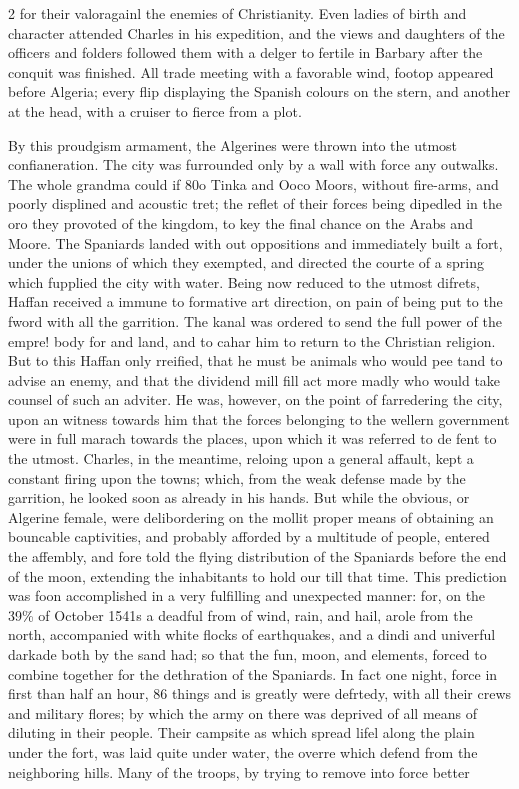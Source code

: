 \documentclass[10pt]{article}
\begin{document}
\begin{multicols}{2}\raggedcolumns
for their valoragainl the enemies of Christianity. Even ladies of birth and character attended Charles in his expedition, and the views and daughters of the officers and folders followed them with a delger to fertile in Barbary after the conquit was finished. All trade meeting with a favorable wind, footop appeared before Algeria; every flip displaying the Spanish colours on the stern, and another at the head, with a cruiser to fierce from a plot.

By this proudgism armament, the Algerines were thrown into the utmost confianeration. The city was furrounded only by a wall with force any outwalks. The whole grandma could if 80o Tinka and Ooco Moors, without fire-arms, and poorly displined and acoustic tret; the reflet of their forces being dipedled in the oro they provoted of the kingdom, to key the final chance on the Arabs and Moore. The Spaniards landed with out oppositions and immediately built a fort, under the unions of which they exempted, and directed the courte of a spring which fupplied the city with water. Being now reduced to the utmost difrets, Haffan received a immune to formative art direction, on pain of being put to the fword with all the garrition. The kanal was ordered to send the full power of the empre! body for and land, and to cahar him to return to the Christian religion. But to this Haffan only rreified, that he must be animals who would pee tand to advise an enemy, and that the dividend mill fill act more madly who would take counsel of such an adviter. He was, however, on the point of farredering the city, upon an witness towards him that the forces belonging to the wellern government were in full marach towards the places, upon which it was referred to de fent to the utmost. Charles, in the meantime, reloing upon a general affault, kept a constant firing upon the towns; which, from the weak defense made by the garrition, he looked soon as already in his hands. But while the obvious, or Algerine female, were delibordering on the mollit proper means of obtaining an bouncable captivities, and probably afforded by a multitude of people, entered the affembly, and fore told the flying distribution of the Spaniards before the end of the moon, extending the inhabitants to hold our till that time. This prediction was foon accomplished in a very fulfilling and unexpected manner: for, on the 39\% of October 1541s a deadful from of wind, rain, and hail, arole from the north, accompanied with white flocks of earthquakes, and a dindi and univerful darkade both by the sand had; so that the fun, moon, and elements, forced to combine together for the dethration of the Spaniards. In fact one night, force in first than half an hour, 86 things and is greatly were defrtedy, with all their crews and military flores; by which the army on there was deprived of all means of diluting in their people. Their campsite as which spread lifel along the plain under the fort, was laid quite under water, the overre which defend from the neighboring hills. Many of the troops, by trying to remove into force better 
\end{multicols}
\end{document}
